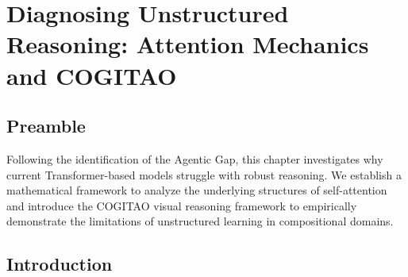 \chapter{Diagnosing Unstructured Reasoning: Attention Mechanics and COGITAO}
\label{ch:cogitao}

\section*{Preamble}
Following the identification of the Agentic Gap, this chapter investigates why current Transformer-based models struggle with robust reasoning. We establish a mathematical framework to analyze the underlying structures of self-attention and introduce the COGITAO visual reasoning framework to empirically demonstrate the limitations of unstructured learning in compositional domains.

\section{Introduction}
\blindtext
